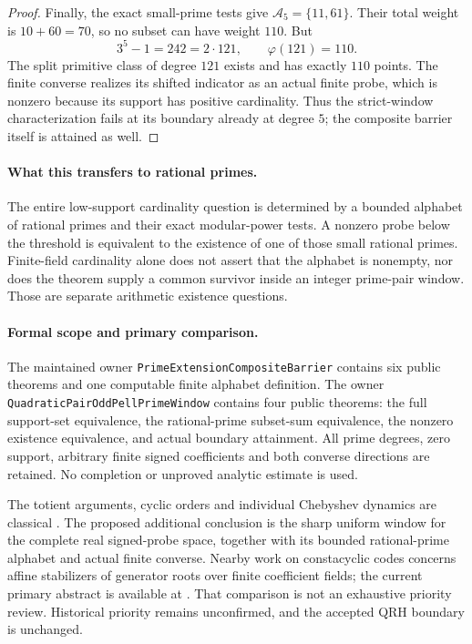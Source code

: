\documentclass[11pt]{article}
\newcommand{\url}[1]{\texttt{\detokenize{#1}}}
\begin{document}
\begin{proof}
Finally, the exact small-prime tests give
\(\mathcal A_5=\{11,61\}\).
Their total weight is \(10+60=70\), so no subset
can have weight \(110\).
But
\[
                     3^5-1=242=2\cdot121,\qquad
                            \varphi(121)=110.
\]
The split primitive class of degree \(121\) exists
and has exactly \(110\) points. The finite converse
realizes its shifted indicator as an actual finite
probe, which is nonzero because its support has
positive cardinality.
Thus the strict-window characterization fails at its
boundary already at degree \(5\); the composite barrier
itself is attained as well.
\end{proof}

\paragraph{What this transfers to rational primes.}
The entire low-support cardinality question is determined
by a bounded alphabet of rational primes and their exact
modular-power tests. A nonzero probe below the threshold
is equivalent to the existence of one of those small
rational primes. Finite-field cardinality alone does
not assert that the alphabet is nonempty, nor does the
theorem supply a common survivor inside an integer
prime-pair window. Those are separate arithmetic
existence questions.

\paragraph{Formal scope and primary comparison.}
The maintained owner \texttt{PrimeExtensionCompositeBarrier}
contains six public theorems and one computable finite
alphabet definition. The owner
\texttt{QuadraticPairOddPellPrimeWindow} contains four
public theorems: the full support-set equivalence,
the rational-prime subset-sum equivalence, the nonzero
existence equivalence, and actual boundary attainment.
All prime degrees, zero support, arbitrary finite signed
coefficients and both converse directions are retained.
No completion or unproved analytic estimate is used.

The totient arguments, cyclic orders and individual
Chebyshev dynamics are classical
\cite{GassertChebyshevGraphs}.
The proposed additional conclusion is the sharp uniform
window for the complete real signed-probe space,
together with its bounded rational-prime alphabet and
actual finite converse. Nearby work on constacyclic
codes concerns affine stabilizers of generator roots
over finite coefficient fields; the current primary
abstract is available at
\url{https://arxiv.org/abs/2609.26414v2}.
That comparison is not an exhaustive priority review.
Historical priority remains unconfirmed, and the
accepted QRH boundary is unchanged.
\end{document}
